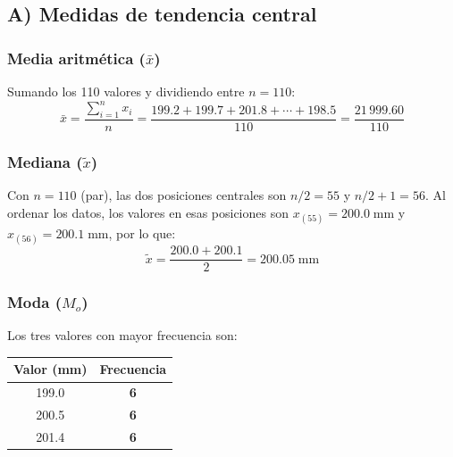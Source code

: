 \subsection{A) Medidas de tendencia central}

\subsubsection*{Media aritm\'etica ($\bar{x}$)}

Sumando los 110 valores y dividiendo entre $n = 110$:
\[
\bar{x} = \frac{\displaystyle\sum_{i=1}^{n} x_i}{n}
        = \frac{199.2 + 199.7 + 201.8 + \cdots + 198.5}{110}
        = \frac{21\,999.60}{110}
\]


\subsubsection*{Mediana ($\tilde{x}$)}

Con $n = 110$ (par), las dos posiciones centrales son $n/2 = 55$ y $n/2 + 1 = 56$.
Al ordenar los datos, los valores en esas posiciones son
$x_{(55)} = 200.0\;\text{mm}$ y $x_{(56)} = 200.1\;\text{mm}$, por lo que:
\[
\tilde{x} = \frac{200.0 + 200.1}{2} = 200.05\;\text{mm}
\]


\subsubsection*{Moda ($M_o$)}

Los tres valores con mayor frecuencia son:

\begin{center}
\begin{tabular}{cc}
\toprule
\rowcolor{azulclaro}
\textbf{Valor (mm)} & \textbf{Frecuencia} \\
\midrule
199.0 & \textbf{6} \\
\rowcolor{grisclaro} 200.5 & \textbf{6} \\
201.4 & \textbf{6} \\
\bottomrule
\end{tabular}
\end{center}


